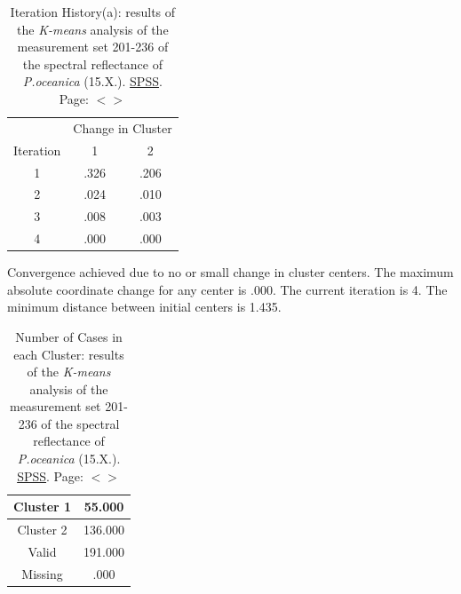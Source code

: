 \documentclass[11pt]{article}
\begin{document}
\begin{appendices}
\begin{table}[H]\footnotesize
	\caption{Iteration History(a): results of the \textit{K-means} analysis of the measurement set 201-236 of the spectral reflectance of \textit{P.oceanica} (15.X.).  \href{http://www.spss.com/}{SPSS}. Page: $<$\pageref{page-41}$>$}
	\begin{center}
	\begin{tabular}{|c|c|c|}
		\hline\hline
		& \multicolumn{2}{|c|}{Change in Cluster} \\
		 Iteration & 1 & 2 \\ \hline\hline
		1 &	.326 &	.206 \\ \hline
		2 &	.024 & 	.010 \\ \hline
		3 &	.008 &	.003 \\ \hline
		4 &	.000 &	.000 \\ \hline
	\end{tabular}
	\end{center}
	Convergence achieved due to no or small change in cluster centers. The maximum absolute coordinate change for any center is .000. The current iteration is 4. The minimum distance between initial centers is 1.435.
\label{tab:21}
\end{table}

\begin{table}[H]
	\caption{Number of Cases in each Cluster: results of the \textit{K-means} analysis of the measurement set 201-236 of the spectral reflectance of \textit{P.oceanica} (15.X.).  \href{http://www.spss.com/}{SPSS}. Page: $<$\pageref{page-41}$>$}
		\begin{center}
		\begin{tabular}{|c|c|}
		\hline\hline
			Cluster 1 & 55.000 \\ \hline
			Cluster 2 & 136.000 \\ \hline
			Valid &	191.000 \\ \hline
			Missing & .000 \\ \hline
		\end{tabular}
		\end{center}
	\label{tab:22}
\end{table}


\end{appendices}
\end{document}
